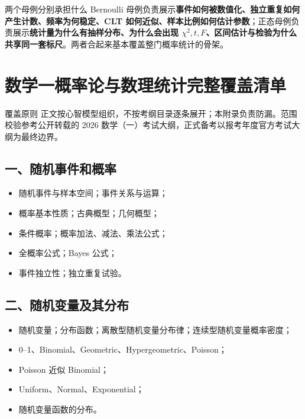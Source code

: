 \documentclass[11pt,a4paper,openany]{ctexbook}
\newcommand{\key}[1]{\textbf{\color{deep}#1}}
\begin{document}
\begin{corebox}{两个母例分别承担什么}
Bernoulli 母例负责展示\key{事件如何被数值化、独立重复如何产生计数、频率为何稳定、CLT 如何近似、样本比例如何估计参数}；正态母例负责展示\key{统计量为什么有抽样分布、为什么会出现 $\chi^2,t,F$、区间估计与检验为什么共享同一套标尺}。两者合起来基本覆盖整门概率统计的骨架。
\end{corebox}

\appendix
\chapter{数学一概率论与数理统计完整覆盖清单}

\begin{methodbox}{覆盖原则}
正文按心智模型组织，不按考纲目录逐条展开；本附录负责防漏。范围校验参考公开转载的 2026 数学（一）考试大纲，正式备考以报考年度官方考试大纲为最终边界。
\end{methodbox}

\section*{一、随机事件和概率}
\begin{itemize}
\item 随机事件与样本空间；事件关系与运算；
\item 概率基本性质；古典概型；几何概型；
\item 条件概率；概率加法、减法、乘法公式；
\item 全概率公式；Bayes 公式；
\item 事件独立性；独立重复试验。
\end{itemize}

\section*{二、随机变量及其分布}
\begin{itemize}
\item 随机变量；分布函数；离散型随机变量分布律；连续型随机变量概率密度；
\item 0--1、Binomial、Geometric、Hypergeometric、Poisson；
\item Poisson 近似 Binomial；
\item Uniform、Normal、Exponential；
\item 随机变量函数的分布。
\end{itemize}
\end{document}
